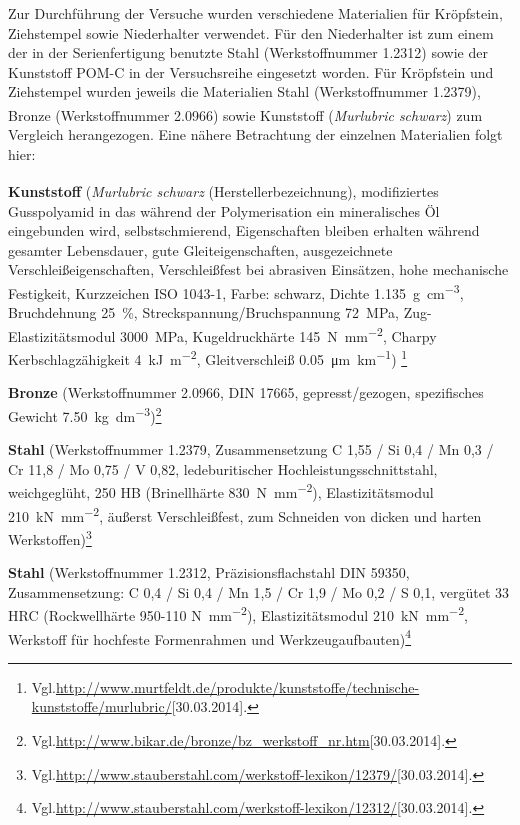 \documentclass[12pt,a4paper,parskip,twoside,BCOR5mm,headsepline]{scrartcl}
\begin{document}
\begin{description*}
\newpage


Zur Durchführung der Versuche wurden verschiedene Materialien für Kröpfstein, Ziehstempel sowie Niederhalter verwendet. Für den Niederhalter ist zum einem der in der Serienfertigung benutzte Stahl (Werkstoffnummer 1.2312) sowie der Kunststoff POM-C in der Versuchsreihe eingesetzt worden. Für Kröpfstein und Ziehstempel wurden jeweils die Materialien Stahl (Werkstoffnummer 1.2379), Bronze (Werkstoffnummer 2.0966) sowie Kunststoff (\emph{Murlubric\textsuperscript{\textregistered} schwarz}) zum Vergleich herangezogen. Eine nähere Betrachtung der einzelnen Materialien folgt hier:

\begin{itemize*}
\item \textbf{Kunststoff} (\emph{Murlubric\textsuperscript{\textregistered} schwarz} (Herstellerbezeichnung), modifiziertes Gusspolyamid in das während der Polymerisation ein mineralisches Öl eingebunden wird, selbstschmierend, Eigenschaften bleiben erhalten während gesamter Lebensdauer, gute Gleiteigenschaften, ausgezeichnete Verschleißeigenschaften, Verschleißfest bei abrasiven Einsätzen, hohe mechanische Festigkeit, Kurzzeichen ISO 1043-1, Farbe: schwarz, Dichte \SI{1,135}{\gram\per\centi\meter\cubed}, Bruchdehnung \SI{25}{\percent}, Streckspannung/Bruchspannung \SI{72}{\mega\pascal}, Zug-Elastizitätsmodul \SI{3000}{\mega\pascal}, Kugeldruckhärte \SI{145}{\newton\per\milli\meter\squared},  Charpy Kerbschlagzähigkeit
 \SI{4}{\kilo\joule\per\meter\squared}, Gleitverschleiß \SI{0,05}{\micro\meter\per\kilo\meter})
\footnote{Vgl.\url{http://www.murtfeldt.de/produkte/kunststoffe/technische-kunststoffe/murlubric/}[30.03.2014].}
\item \textbf{Bronze} (Werkstoffnummer 2.0966, DIN 17665, gepresst/gezogen, spezifisches Gewicht \SI{7.50}{\kilo\gram\per\deci\meter\cubed})\footnote{Vgl.\url{http://www.bikar.de/bronze/bz_werkstoff_nr.htm}[30.03.2014].}
\item \textbf{Stahl} (Werkstoffnummer 1.2379, Zusammensetzung C 1,55 / Si 0,4 / Mn 0,3 / Cr 11,8 / Mo 0,75 / V 0,82, ledeburitischer Hochleistungsschnittstahl,  weichgeglüht, 250 HB (Brinellhärte \SI{830}{\newton\per\milli\meter\squared}), Elastizitätsmodul  \SI{210}{\kilo\newton\per\milli\meter\squared}, äußerst Verschleißfest, zum Schneiden von dicken und harten Werkstoffen)\footnote{Vgl.\url{http://www.stauberstahl.com/werkstoff-lexikon/12379/}[30.03.2014].}
\item \textbf{Stahl} (Werkstoffnummer 1.2312, Präzisionsflachstahl DIN 59350, Zusammensetzung: C 0,4 / Si 0,4 / Mn 1,5 / Cr 1,9 / Mo 0,2 / S 0,1, vergütet 33 HRC (Rockwellhärte 950-110 \si{\newton\per\milli\meter\squared}), Elastizitätsmodul \SI{210}{\kilo\newton\per\milli\meter\squared}, Werkstoff für hochfeste Formenrahmen und Werkzeugaufbauten)\footnote{Vgl.\url{http://www.stauberstahl.com/werkstoff-lexikon/12312/}[30.03.2014].}

\end{itemize*}
\end{description*}
\end{document}
